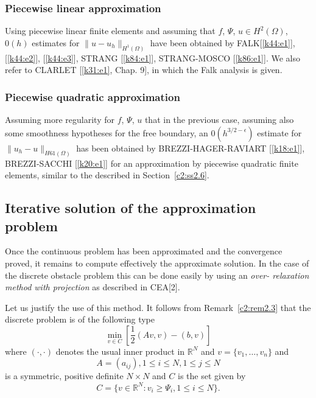 \subsubsection{Piecewise linear approximation}\label{c2:sss2.7.1}

Using piecewise linear finite elements and assuming that $f $, $\Psi$,
$u \in H^2 (\Omega)$, $0(h)$ estimates for $\parallel  u-u_h
\parallel_{H^1(\Omega)}$ have been obtained by FALK[\ref{k44:e1}],
[\ref{k44:e2}], [\ref{k44:e3}], STRANG [\ref{k84:e1}],
STRANG-MOSCO [\ref{k86:e1}]. We also refer to CLARLET [\ref{k31:e1},
  Chap. 9], in which the Falk analysis is given.  

\subsubsection{Piecewise quadratic approximation}\label{c2:sss2.7.2}%
 Assuming more regularity for $f$, $\Psi$, $u$ that in the previous
 case, assuming also some smoothness hypotheses for the free boundary,
 an $0(h^{3/2-\epsilon})$ estimate for $\parallel  u_h - u\parallel_{H61(\Omega)}$ has
 been obtained by BREZZI-HAGER-RAVIART [\ref{k18:e1}], BREZZI-SACCHI
 [\ref{k20:e1}] for an
 approximation by piecewise quadratic finite elements, similar to the
 described in Section~\ref{c2:ss2.6}. 

\subsection{Iterative solution of the approximation
  problem}\label{c2:ss2.8}%

Once the continuous problem has been approximated and the convergence
proved, it remains to compute effectively  the approximate
solution. In the case of the discrete obstacle problem this can be
done easily by using an \textit{over- relaxation method with
  projection} as described in CEA[2]. 

Let us justify the use of this method. It follows from
Remark~\ref{c2:rem2.3} that the discrete problem is of the following type 
\begin{equation}
\min_{v \in C} \left[\frac{1}{2} (Av, v) - (b, v) \right
]\tag{2.53}\label{c2:eq2.53} 
\end{equation}
where $(\cdot ,\cdot)$ denotes the usual inner product in
$\mathbb{R}^N$ and $v = \{v_1, \ldots, v_n \}$ and  
\begin{equation}
A = (a_{ij}), 1 \leq i \leq N, 1 \leq j \leq
N\tag{2.54}\label{c2:eq2.54}  
\end{equation}
is a symmetric, positive definite $N \times N$ and $C$ is the set
given by  
\begin{equation}
C = \{v \in \mathbb{R}^N : v_i \geq \Psi_i, 1 \leq i \leq N
\}. \tag{2.55}\label{c2:eq2.55} 
\end{equation}


